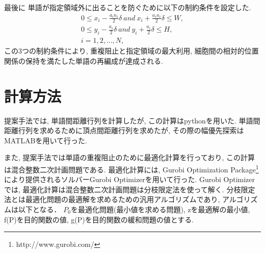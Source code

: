 \documentclass[syuuron]{kuee}
\begin{document}
				最後に 単語が指定領域外に出ることを防ぐために以下の制約条件を設定した.
				\begin{eqnarray}
					0 \le x_i  -  \frac{a_i n_i} {2} \delta \:  and \:  x_i  +  \frac{a_i n_i} {2} \delta \le W, \nonumber \\
					0 \le y_i  -  \frac{a_i} {2} \delta  \: and \:  y_i  +  \frac{a_i} {2} \delta \le H ,\\
					i = 1, 2, ...,N, \nonumber
				\end{eqnarray}
				この3つの制約条件により, 重複阻止と指定領域の最大利用, 細胞間の相対的位置関係の保持を満たした単語の再編成が達成される. 
	
	\section{計算方法}
		提案手法では, 単語間距離行列を計算したが, この計算はpythonを用いた. 
		単語間距離行列を求めるために頂点間距離行列を求めたが, その際の幅優先探索はMATLABを用いて行った. 
				
		また, 提案手法では単語の重複阻止のために最適化計算を行っており, この計算は混合整数二次計画問題である. 
		最適化計算には, Gurobi Optimization Package\footnote{http://www.gurobi.com/}により提供されるソルバーGurobi Optimizerを用いて行った.
		Gurobi Optimizerでは, 最適化計算は混合整数二次計画問題は分枝限定法を使って解く. 
		分枝限定法とは最適化問題の最適解を求めるための汎用アルゴリズムであり, アルゴリズムは以下となる．
		$P_0$を最適化問題(最小値を求める問題), zを最適解の最小値, f(P)を目的関数の値, g(P)を目的関数の緩和問題の値とする. 
				
\end{document}
